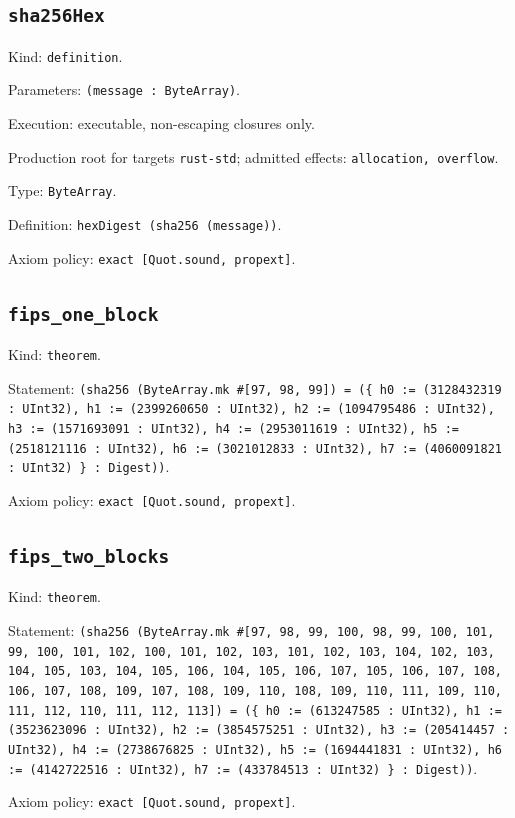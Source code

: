 \documentclass[11pt]{article}
\begin{document}
\subsection*{\texttt{sha256Hex}}
\noindent Kind: \texttt{definition}.\par
\noindent Parameters: \texttt{(message : ByteArray)}.\par
\noindent Execution: executable, non-escaping closures only.\par
\noindent Production root for targets \texttt{rust-std}; admitted effects: \texttt{allocation, overflow}.\par
\noindent Type: \texttt{ByteArray}.\par
\noindent Definition: \texttt{hexDigest (sha256 (message))}.\par
\noindent Axiom policy: \texttt{exact [Quot.sound, propext]}.\par
\subsection*{\texttt{fips\_one\_block}}
\noindent Kind: \texttt{theorem}.\par
\noindent Statement: \texttt{(sha256 (ByteArray.mk \#[97, 98, 99]) = (\{ h0 := (3128432319 : UInt32), h1 := (2399260650 : UInt32), h2 := (1094795486 : UInt32), h3 := (1571693091 : UInt32), h4 := (2953011619 : UInt32), h5 := (2518121116 : UInt32), h6 := (3021012833 : UInt32), h7 := (4060091821 : UInt32) \} : Digest))}.\par
\noindent Axiom policy: \texttt{exact [Quot.sound, propext]}.\par
\subsection*{\texttt{fips\_two\_blocks}}
\noindent Kind: \texttt{theorem}.\par
\noindent Statement: \texttt{(sha256 (ByteArray.mk \#[97, 98, 99, 100, 98, 99, 100, 101, 99, 100, 101, 102, 100, 101, 102, 103, 101, 102, 103, 104, 102, 103, 104, 105, 103, 104, 105, 106, 104, 105, 106, 107, 105, 106, 107, 108, 106, 107, 108, 109, 107, 108, 109, 110, 108, 109, 110, 111, 109, 110, 111, 112, 110, 111, 112, 113]) = (\{ h0 := (613247585 : UInt32), h1 := (3523623096 : UInt32), h2 := (3854575251 : UInt32), h3 := (205414457 : UInt32), h4 := (2738676825 : UInt32), h5 := (1694441831 : UInt32), h6 := (4142722516 : UInt32), h7 := (433784513 : UInt32) \} : Digest))}.\par
\noindent Axiom policy: \texttt{exact [Quot.sound, propext]}.\par
\end{document}
